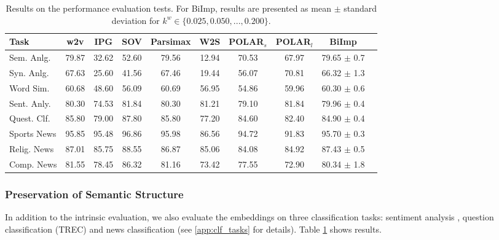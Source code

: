 \documentclass[11pt,a4paper]{article}
\def\proposedmethod{BiImp}
\begin{document}
\begin{table}
    \centering
	\begin{tabular}{lccccccccc}
		\hline \hline 
		\textbf{Task} & \textbf{w2v} & \textbf{IPG} & \textbf{SOV} & \textbf{Parsimax} & \textbf{W2S} & \textbf{POLAR$_s$} & \textbf{POLAR$_l$} & \textbf{\proposedmethod{}} \\ \hline \hline %
	    Sem. Anlg. & 79.87 & 32.62 & 52.60 & 79.56 & 12.94 & 70.53 & 67.97 & 79.65 $\pm$ 0.7 \\
	    Syn. Anlg. & 67.63 & 25.60 & 41.56 & 67.46 & 19.44 & 56.07 & 70.81 & 66.32 $\pm$ 1.3 \\ 
	    \hline %
	    Word Sim. & 60.68 & 48.60 & 56.09 & 60.69 & 56.95 & 54.86 & 59.96 & 60.30 $\pm$ 0.6 \\
	    \hline %
	    Sent. Anly. & 80.30 & 74.53 & 81.84 & 80.30 & 81.21 & 79.10 & 81.84 & 79.96 $\pm$ 0.4 \\ \hline %
	    Quest. Clf. & 85.80 & 79.00 & 87.80 & 85.80 & 77.20 & 84.60 & 82.40 & 84.90 $\pm$ 0.4 \\ \hline %
	    Sports News & 95.85 & 95.48 & 96.86 & 95.98 & 86.56 & 94.72 & 91.83 & 95.70 $\pm$ 0.3 \\
	    Relig. News & 87.01 & 85.75 & 88.55 & 86.87 & 85.06 & 84.08 & 84.92 & 87.43 $\pm$ 0.5 \\
	    Comp. News & 81.55 & 78.45 & 86.32 & 81.16 & 73.42 & 77.55 & 72.90 & 80.34 $\pm$ 1.8 \\ \hline \hline %
	\end{tabular}
	\caption{ Results on the performance evaluation tests. For \proposedmethod{}, results are presented as mean $\pm$
standard deviation for $k^w \in \{0.025,0.050,...,0.200\}$.}
	\label{tab:performance_tests}
\end{table}

\subsubsection{Preservation of Semantic Structure}
\label{sec:sem_structure}
In addition to the intrinsic evaluation, we also evaluate
the embeddings on three classification tasks: sentiment analysis \citep{socher13treebank}, question classification (TREC) \citep{li06learning} and news classification \citep{faruqui15sparse} (see \ref{app:clf_tasks} for details). 
Table \ref{tab:performance_tests} shows results.

\end{document}
